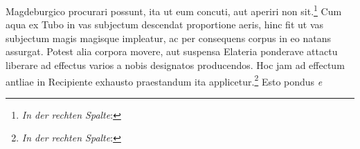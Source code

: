  Magdeburgico\protect{} procurari possunt, ita ut eum  concuti, aut aperiri  non sit.\footnote{\textit{In der rechten Spalte}: } Cum aqua  ex Tubo  in vas subjectum  descendat  proportione aeris, hinc fit ut vas  subjectum magis magisque impleatur, ac per consequens  corpus in eo natans assurgat. Potest  alia corpora movere, aut suspensa Elateria\protect{}  ponderave attactu liberare ad effectus varios a nobis designatos  producendos. Hoc jam ad effectum antliae\protect{} in Recipiente  exhausto praestandum ita applicetur.\footnote{\textit{In der rechten Spalte}: } Esto pondus \textit{e} 
